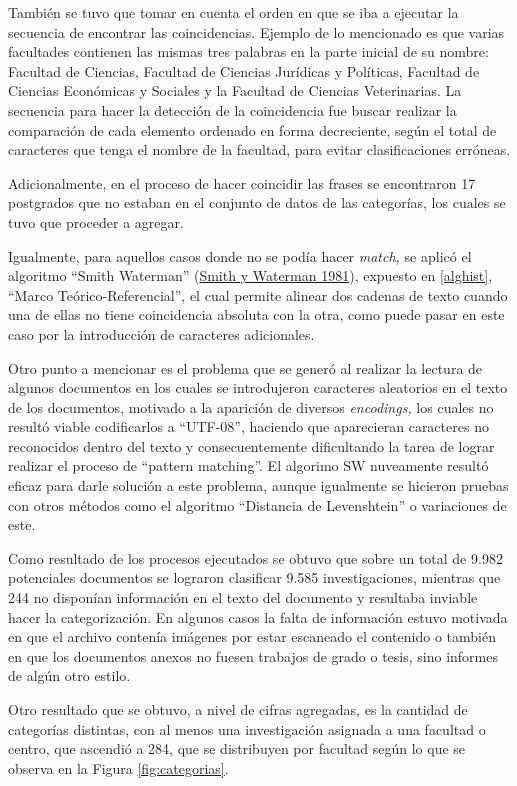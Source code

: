 \documentclass[
  12pt,
  openany]{book}
\begin{document}
También se tuvo que tomar en cuenta el orden en que se iba a ejecutar la secuencia de encontrar las coincidencias. Ejemplo de lo mencionado es que varias facultades contienen las mismas tres palabras en la parte inicial de su nombre: Facultad de Ciencias, Facultad de Ciencias Jurídicas y Políticas, Facultad de Ciencias Económicas y Sociales y la Facultad de Ciencias Veterinarias. La secuencia para hacer la detección de la coincidencia fue buscar realizar la comparación de cada elemento ordenado en forma decreciente, según el total de caracteres que tenga el nombre de la facultad, para evitar clasificaciones erróneas.

Adicionalmente, en el proceso de hacer coincidir las frases se encontraron 17 postgrados que no estaban en el conjunto de datos de las categorías, los cuales se tuvo que proceder a agregar.

Igualmente, para aquellos casos donde no se podía hacer \emph{match,} se aplicó el algoritmo ``Smith Waterman'' (\protect\hyperlink{ref-smith1981}{Smith y Waterman 1981}), expuesto en \ref{alghist}, ``Marco Teórico-Referencial'', el cual permite alinear dos cadenas de texto cuando una de ellas no tiene coincidencia absoluta con la otra, como puede pasar en este caso por la introducción de caracteres adicionales.

Otro punto a mencionar es el problema que se generó al realizar la lectura de algunos documentos en los cuales se introdujeron caracteres aleatorios en el texto de los documentos, motivado a la aparición de diversos \emph{encodings,} los cuales no resultó viable codificarlos a ``UTF-08'', haciendo que aparecieran caracteres no reconocidos dentro del texto y consecuentemente dificultando la tarea de lograr realizar el proceso de ``pattern matching''. El algorimo SW nuveamente resultó eficaz para darle solución a este problema, aunque igualmente se hicieron pruebas con otros métodos como el algoritmo ``Distancia de Levenshtein'' o variaciones de este.

Como resultado de los procesos ejecutados se obtuvo que sobre un total de 9.982 potenciales documentos se lograron clasificar 9.585 investigaciones, mientras que 244 no disponían información en el texto del documento y resultaba inviable hacer la categorización. En algunos casos la falta de información estuvo motivada en que el archivo contenía imágenes por estar escaneado el contenido o también en que los documentos anexos no fuesen trabajos de grado o tesis, sino informes de algún otro estilo.

Otro resultado que se obtuvo, a nivel de cifras agregadas, es la cantidad de categorías distintas, con al menos una investigación asignada a una facultad o centro, que ascendió a 284, que se distribuyen por facultad según lo que se observa en la Figura \ref{fig:categorias}.
\end{document}
